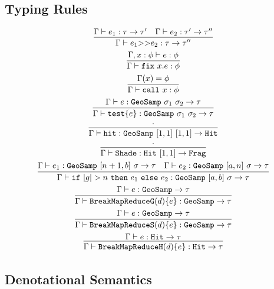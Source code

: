 \documentclass{article}
\newcommand {\chain}{\mathtt{>>}}
\newcommand {\fix}{\mathtt{fix}}
\newcommand {\call}{\mathtt{call}}
\newcommand {\test}{\mathtt{test}}
\newcommand {\isect}{\mathtt{hit}}
\newcommand {\shade}{\mathtt{Shade}}
\newcommand {\bmrg}{\mathtt{BreakMapReduceG}}
\newcommand {\bmrs}{\mathtt{BreakMapReduceS}}
\newcommand {\bmrh}{\mathtt{BreakMapReduceH}}
\newcommand {\geosamp}{\mathtt{GeoSamp}}
\newcommand {\hit}{\mathtt{Hit}}
\newcommand {\frag}{\mathtt{Frag}}
\newcommand {\inferenceSpacing}{\setlength{\jot}{3ex}}
\begin{document}
\subsection{Typing Rules}
\inferenceSpacing
\begin{gather}
\infer {\Gamma\vdash e_1 \chain e_2 : \tau \to \tau''}{\Gamma \vdash e_1 : \tau\to \tau' & \Gamma \vdash e_2 : \tau' \to \tau''} \\
\infer {\Gamma\vdash \fix~x.e : \phi}{\Gamma, x:\phi \vdash e : \phi} \\
\infer {\Gamma\vdash \call~x : \phi}{\Gamma(x) = \phi} \\
\infer {\Gamma\vdash \test \{ e \} : \geosamp~\sigma_1~\sigma_2 \to \tau}{\Gamma \vdash e : \geosamp~\sigma_1~\sigma_2  \to \tau} \\
\infer {\Gamma \vdash \isect : \geosamp~[1,1]~[1,1] \to \hit} {\cdot} \\
\infer {\Gamma \vdash \shade : \hit~[1,1] \to \frag} {\cdot} \\
\infer {\Gamma \vdash  \mathtt{if~}|g| > n \mathtt{~then~} e_1 \mathtt{~else~} e_2 : \geosamp~[a,b]~\sigma \to \tau} {\Gamma \vdash e_1 : \geosamp~[n+1,b]~\sigma \to \tau & \Gamma \vdash e_2 : \geosamp~[a,n]~\sigma \to \tau} \\
\infer {\Gamma \vdash \bmrg (d) \{ e \} : \geosamp \to \tau} {\Gamma \vdash e : \geosamp \to \tau } \\
\infer {\Gamma \vdash \bmrs (d) \{ e \} : \geosamp \to \tau} {\Gamma \vdash e : \geosamp \to \tau } \\
\infer {\Gamma \vdash \bmrh (d) \{ e \} : \hit \to \tau} {\Gamma \vdash e : \hit \to \tau }
\end{gather}

\subsection{Denotational Semantics}
\end{document}
